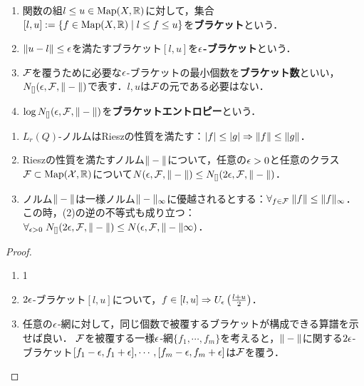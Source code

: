 \documentclass[uplatex,dvipdfmx]{jsreport}
\begin{document}
\begin{definition}\mbox{}
    \begin{enumerate}
        \item 関数の組$l\le u\in\mathrm{Map}(X,\mathbb{R})$に対して，集合$[l,u]:=\left\{f\in\mathrm{Map}(X,\mathbb{R})\mid l\le f\le u\right\}$を\textbf{ブラケット}という．
        \item $\|u-l\|\le\epsilon$を満たすブラケット$[l,u]$を\textbf{$\epsilon$-ブラケット}という．
        \item $\mathcal{F}$を覆うために必要な$\epsilon$-ブラケットの最小個数を\textbf{ブラケット数}といい，$N_{[]}(\epsilon,\mathcal{F},\|-\|)$で表す．$l,u$は$\mathcal{F}$の元である必要はない．
        \item $\log N_{[]}(\epsilon,\mathcal{F},\|-\|)$を\textbf{ブラケットエントロピー}という．
    \end{enumerate}
\end{definition}

\begin{lemma}[Rieszの性質]\mbox{}\label{lemma-Riesz}
    \begin{enumerate}
        \item $L_r(Q)$-ノルムはRieszの性質を満たす：$\lvert f\rvert\le\lvert g\rvert\Rightarrow\|f\|\le\|g\|$．
        \item Rieszの性質を満たすノルム$\|-\|$について，任意の$\epsilon>0$と任意のクラス$\mathcal{F}\subset\mathrm{Map}(\mathcal{X},\mathbb{R})$について$N(\epsilon,\mathcal{F},\|-\|)\le N_{[]}(2\epsilon,\mathcal{F},\|-\|)$．
        \item ノルム$\|-\|$は一様ノルム$\|-\|_\infty$に優越されるとする：$\forall_{f\in\mathcal{F}}\;\|f\|\le\|f\|_\infty$．この時，(2)の逆の不等式も成り立つ：$\forall_{\epsilon>0}\;N_{[]}(2\epsilon,\mathcal{F},\|-\|)\le N(\epsilon,\mathcal{F},\|-\|\infty)$．
    \end{enumerate}
\end{lemma}
\begin{proof}\mbox{}
    \begin{enumerate}
        \item 1
        \item $2\epsilon$-ブラケット$[l,u]$について，$f\in[l,u]\Rightarrow U_{\epsilon}\left(\frac{l+u}{2}\right)$．
        \item 任意の$\epsilon$-網に対して，同じ個数で被覆するブラケットが構成できる算譜を示せば良い．
        $\mathcal{F}$を被覆する一様$\epsilon$-網$\{f_1,\cdots,f_m\}$を考えると，$\|-\|$に関する$2\epsilon$-ブラケット$[f_1-\epsilon,f_1+\epsilon],\cdots,[f_m-\epsilon,f_m+\epsilon]$は$\mathcal{F}$を覆う．
    \end{enumerate}
\end{proof}
\end{document}
